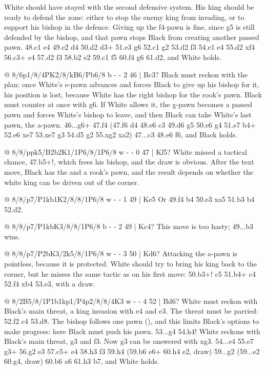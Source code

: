 White should have stayed with the second defensive system. His king should be ready to defend the zone: either to stop the enemy king from invading, or to support his bishop in the defence. Giving up the f4-pawn is fine, since g5 is still defended by the bishop, and that pawn stops Black from creating another passed pawn. 48.\B c1 \B e4 49.\K e2 d4 50.\B d2 d3+ 51.\K e3 \B g6 52.\B c1 \K g2 53.\K d2 \K f3 54.\K e1 \K e4 55.\K d2 \K xf4 56.\K c3+ \K e4 57.\B d2 \K f3 58.\K b2 \K e2 59.\K c1 \B f5 60.\B f4 \B g6 61.\B d2, and White holds.

@ 8/6p1/8/4PK2/8/kB6/Pb6/8 b - - 2 46 | Bc3?
Black must reckon with the plan: once White's e-pawn advances and forces Black to give up his bishop for it, his position is lost, because White has the right bishop for the rook's pawn. Black must counter at once with g6. If White allows it, the g-pawn becomes a passed pawn and forces White's bishop to leave, and then Black can take White's last pawn, the a-pawn. 46...g6+ 47.\K f4 (47.\K f6 \B d4 48.\K e6 \B c3 49.\K d6 g5 50.e6 g4 51.e7 \B b4+ 52.\K e6 \B xe7 53.\K xe7 g3 54.\B d5 g2 55.\B xg2 \K xa2) 47...\B c3 48.e6 \B f6, and Black holds.

@ 8/8/ppk5/B2b2K1/1P6/8/1P6/8 w - - 0 47 | Kf5?
White missed a tactical chance, 47.b5+!, which frees his bishop, and the draw is obvious. After the text move, Black has the  and a rook's pawn, and the result depends on whether the white king can be driven out of the corner.

@ 8/8/p7/P1kb1K2/8/8/1P6/8 w - - 1 49 | Ke5
Or 49.\K f4 \K b4 50.\K e3 \K xa5 51.b3 \K b4 52.\K d2.

@ 8/8/p7/P1kbK3/8/8/1P6/8 b - - 2 49 | Kc4?
This move is too hasty; 49...\B b3 wins.

@ 8/8/p7/P2bK3/2k5/8/1P6/8 w - - 3 50 | Kd6?
Attacking the a-pawn is pointless, because it is protected. White should try to bring his king back to the corner, but he misses the same tactic as on his first move: 50.b3+! \K c5 51.b4+ \K c4 52.\K f4 \K xb4 53.\K e3, with a draw.

@ 8/2B5/8/1P1b1kp1/P4p2/8/8/4K3 w - - 4 52 | Bd6?
White must reckon with Black's main threat, a king invasion with \K e4 and \K e3. The threat must be parried: 52.\K f2 \B c4 53.\B d8. The bishop follows one pawn (), and this limits Black's options to make progress: here Black must push his pawn. 53...g4 54.\B h4! White reckons with Black's main threat, g3 and \K f3. Now g3 can be answered with \B xg3. 54...\K e4 55.\B e7 g3+ 56.\K g2 \K e3 57.\B c5+ \K e4 58.\K h3 \K f3 59.\K h4 (59.\B b6 \B e6+ 60.\K h4 \K e2, draw) 59...g2 (59...\K e2 60.\K g4, draw) 60.b6 \B a6 61.\K h3 \B b7, and White holds.

